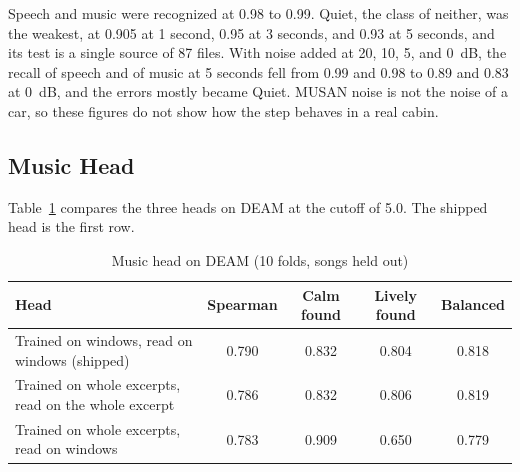 Speech and music were recognized at 0.98 to 0.99. Quiet, the class of neither, was the weakest, at 0.905 at 1 second, 0.95 at 3 seconds, and 0.93 at 5 seconds, and its test is a single source of 87 files. With noise added at 20, 10, 5, and 0~dB, the recall of speech and of music at 5 seconds fell from 0.99 and 0.98 to 0.89 and 0.83 at 0~dB, and the errors mostly became Quiet. MUSAN noise is not the noise of a car, so these figures do not show how the step behaves in a real cabin.

\subsection{Music Head}
\label{sec:ai-music}
Table~\ref{tab:ai-deam} compares the three heads on DEAM at the cutoff of 5.0. The shipped head is the first row.

\begin{table}[htbp]
    \centering
    \caption{Music head on DEAM (10 folds, songs held out)}\label{tab:ai-deam}
    \small
    \renewcommand{\arraystretch}{1.2}
    \begin{tabular}{|>{\raggedright\arraybackslash}p{}|c|c|c|c|}
        \hline
        \textbf{Head} & \textbf{Spearman} & \textbf{Calm found} & \textbf{Lively found} & \textbf{Balanced} \\
        \hline
        Trained on windows, read on windows (shipped) & 0.790 & 0.832 & 0.804 & 0.818 \\
        \hline
        Trained on whole excerpts, read on the whole excerpt & 0.786 & 0.832 & 0.806 & 0.819 \\
        \hline
        Trained on whole excerpts, read on windows & 0.783 & 0.909 & 0.650 & 0.779 \\
        \hline
    \end{tabular}
\end{table}

